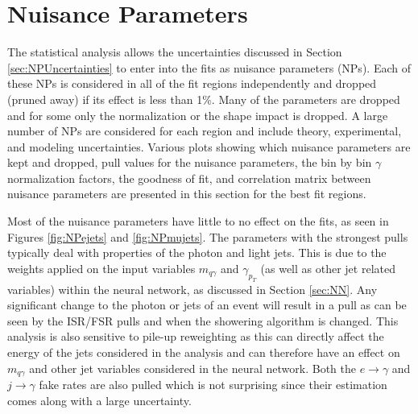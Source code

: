 \section{Nuisance Parameters}
The statistical analysis allows the uncertainties discussed in Section \ref{sec:NPUncertainties} to enter into the fits as nuisance parameters (NPs).  Each of these NPs is considered in all of the fit regions independently and dropped (pruned away) if its effect is less than 1\%.  Many of the parameters are dropped and for some only the normalization or the shape impact is dropped.  A large number of NPs are considered for each region and include theory, experimental, and modeling uncertainties.  Various plots showing which nuisance parameters are kept and dropped, pull values for the nuisance parameters, the bin by bin $\gamma$ normalization factors, the goodness of fit, and correlation matrix between nuisance parameters are presented in this section for the best fit regions.

Most of the nuisance parameters have little to no effect on the fits, as seen in Figures \ref{fig:NPejets} and \ref{fig:NPmujets}.  The parameters with the strongest pulls typically deal with properties of the photon and light jets.  This is due to the weights applied on the input variables $m_{q\gamma}$ and $\gamma_{p_T}$ (as well as other jet related variables) within the neural network, as discussed in Section \ref{sec:NN}.  Any significant change to the photon or jets of an event will result in a pull as can be seen by the ISR/FSR pulls and when the showering algorithm is changed.  This analysis is also sensitive to pile-up reweighting as this can directly affect the energy of the jets considered in the analysis and can therefore have an effect on $m_{q\gamma}$ and other jet variables considered in the neural network.  Both the $e\rightarrow \gamma$ and $j\rightarrow \gamma$ fake rates are also pulled which is not surprising since their estimation comes along with a large uncertainty.


